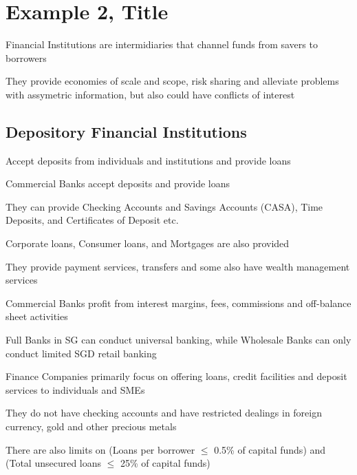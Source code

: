 \section{Example 2, Title}
Financial Institutions are intermidiaries that channel funds 
from savers to borrowers

They provide economies of scale and scope, risk sharing and alleviate
problems with assymetric information, but also could have conflicts of interest

\subsection{Depository Financial Institutions}
Accept deposits from individuals and institutions and provide loans

Commercial Banks accept deposits and provide loans

They can provide Checking Accounts and Savings Accounts (CASA), Time Deposits, and Certificates of Deposit etc.

Corporate loans, Consumer loans, and Mortgages are also provided

They provide payment services, transfers and some also have wealth management services

Commercial Banks profit from interest margins, fees, commissions and off-balance sheet activities

\begin{callout}
    Full Banks in SG can conduct universal banking, while Wholesale Banks can only conduct limited SGD retail banking
\end{callout}

Finance Companies primarily focus on offering loans, credit facilities and deposit services to individuals and SMEs

They do not have checking accounts and have restricted dealings in foreign currency, gold and other precious metals

There are also limits on (Loans per borrower $\leq$ 0.5\% of capital funds) and (Total unsecured loans $\leq$ 25\% of capital funds)

